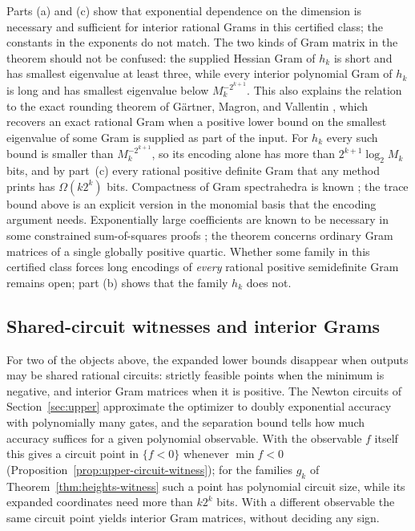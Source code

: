 Parts (a) and (c) show that exponential dependence on the dimension is
necessary and sufficient for interior rational Grams in this certified
class; the constants in the exponents do not match. The two kinds of Gram
matrix in the theorem should not be confused: the supplied Hessian Gram of
$h_k$ is short and has smallest eigenvalue at least three, while every
interior polynomial Gram of $h_k$ is long and has smallest eigenvalue below
$M_k^{-2^{k+1}}$. This also explains the relation to the exact rounding
theorem of G\"artner, Magron, and Vallentin
\cite[Corollary~1.3]{GaertnerMagronVallentin2026}, which recovers an exact
rational Gram when a positive lower bound on the smallest eigenvalue of some
Gram is supplied as part of the input. For $h_k$ every such bound is smaller
than $M_k^{-2^{k+1}}$, so its encoding alone has more than
$2^{k+1}\log_2M_k$ bits, and by part~(c) every rational positive definite
Gram that any method prints has $\Omega(k2^k)$ bits. Compactness of Gram
spectrahedra is
known \cite[Lemma~1.5]{ChuaPlaumannSinnVinzant2017}; the trace bound above
is an explicit version in the monomial basis that the encoding argument
needs. Exponentially large coefficients are known to be necessary in some
constrained sum-of-squares proofs \cite{ODonnell2017,RaghavendraWeitz2017};
the theorem concerns ordinary Gram matrices of a single globally positive
quartic. Whether some family in this certified class forces long
encodings of \emph{every} rational positive semidefinite Gram remains open;
part (b) shows that the family $h_k$ does not.

\subsection{Shared-circuit witnesses and interior Grams}
\label{sec:heights-circuit}

For two of the objects above, the expanded lower bounds disappear when
outputs may be shared rational circuits: strictly feasible points when the
minimum is negative, and interior Gram matrices when it is positive. The
Newton circuits of Section~\ref{sec:upper} approximate the
optimizer to doubly exponential accuracy with polynomially many gates, and the
separation bound tells how much accuracy suffices for a given polynomial
observable. With the observable $f$ itself this gives a circuit point in
$\{f<0\}$ whenever $\min f<0$
(Proposition~\ref{prop:upper-circuit-witness}); for the families $g_k$ of
Theorem~\ref{thm:heights-witness} such a point has polynomial circuit size,
while its expanded coordinates need more than $k2^k$ bits. With a different
observable the same circuit point yields interior Gram matrices, without
deciding any sign.

